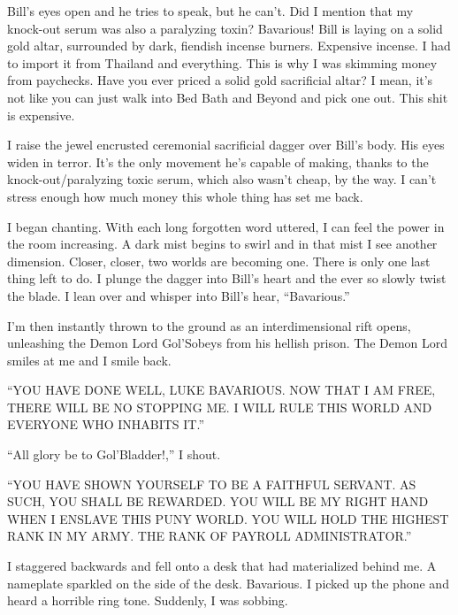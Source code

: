 Bill's eyes open and he tries to speak, but he can't. Did I mention
that my knock-out serum was also a paralyzing toxin? Bavarious!
Bill is laying on a solid gold altar, surrounded by dark, fiendish
incense burners. Expensive incense. I had to import it from
Thailand and everything. This is why I was skimming money from
paychecks. Have you ever priced a solid gold sacrificial altar? I
mean, it's not like you can just walk into Bed Bath and Beyond and
pick one out. This shit is expensive.



I raise the jewel encrusted ceremonial sacrificial dagger over
Bill's body. His eyes widen in terror. It's the only movement he's
capable of making, thanks to the knock-out/paralyzing toxic serum,
which also wasn't cheap, by the way. I can't stress enough how much
money this whole thing has set me back.



I began chanting. With each long forgotten word uttered, I can feel
the power in the room increasing. A dark mist begins to swirl and
in that mist I see another dimension. Closer, closer, two worlds
are becoming one. There is only one last thing left to do. I plunge
the dagger into Bill's heart and the ever so slowly twist the
blade. I lean over and whisper into Bill's hear, ``Bavarious.''



I'm then instantly thrown to the ground as an interdimensional rift
opens, unleashing the Demon Lord Gol'Sobeys from his hellish
prison. The Demon Lord smiles at me and I smile back.



``YOU HAVE DONE WELL, LUKE BAVARIOUS. NOW THAT I AM FREE, THERE WILL
BE NO STOPPING ME. I WILL RULE THIS WORLD AND EVERYONE WHO INHABITS
IT.''



``All glory be to Gol'Bladder!,'' I shout.



``YOU HAVE SHOWN YOURSELF TO BE A FAITHFUL SERVANT. AS SUCH, YOU
SHALL BE REWARDED. YOU WILL BE MY RIGHT HAND WHEN I ENSLAVE THIS
PUNY WORLD. YOU WILL HOLD THE HIGHEST RANK IN MY ARMY. THE RANK OF
PAYROLL ADMINISTRATOR.''



I staggered backwards and fell onto a desk that had materialized
behind me. A nameplate sparkled on the side of the desk. Bavarious.
I picked up the phone and heard a horrible ring tone. Suddenly, I
was sobbing.



